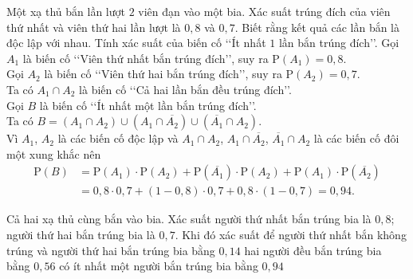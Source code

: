 \begin{bt}%

    Một xạ thủ bắn lần lượt $2$ viên đạn vào một bia. Xác suất trúng đích của viên thứ nhất và viên thứ hai lần lượt là $0{,}8$ và $0{,}7$. Biết rằng kết quả các lần bắn là độc lập với nhau. Tính xác suất của biến cố \lq\lq Ít nhất $1$ lần bắn trúng đích\rq\rq.
    \loigiai
    {
        Gọi $A_1$ là biến cố \lq\lq Viên thứ nhất bắn trúng đích\rq\rq, suy ra $\mathrm{P}\left(A_1\right)=0{,}8$.\\
        Gọi $A_2$ là biến cố \lq\lq Viên thứ hai bắn trúng đích\rq\rq, suy ra $\mathrm{P}\left(A_2\right)=0{,}7$.\\
        Ta có $A_1\cap A_2$ là biến cố \lq\lq Cả hai lần bắn đều trúng đích\rq\rq.\\
        Gọi $B$ là biến cố \lq\lq Ít nhất một lần bắn trúng đích\rq\rq.\\
        Ta có $B=\left(A_1\cap A_2\right)\cup\left(A_1\cap\overline{A_2}\right)\cup\left(\overline{A_1}\cap A_2\right)$.\\
        Vì $A_1$, $A_2$ là các biến cố độc lập và $A_1\cap A_2$, $ A_1\cap\overline{A_2}$, $\overline{A_1}\cap A_2$ là các biến cố đôi một xung khắc nên
        $$\begin{aligned}
            \mathrm{P}(B)
            &=\mathrm{P}\left(A_1\right)\cdot\mathrm{P}\left(A_2\right)+\mathrm{P}\left(\overline{A_1}\right)\cdot\mathrm{P}\left(A_2\right)+\mathrm{P}\left(A_1\right)\cdot\mathrm{P}\left(\overline{A_2}\right) \\
            &=0{,}8\cdot0{,}7+\left(1-0{,}8\right)\cdot0{,}7+0{,}8\cdot\left(1-0{,}7\right)=0{,}94.
        \end{aligned}$$
    }
\end{bt}

\begin{ex}%
	Cả hai xạ thủ cùng bắn vào bia. Xác suất người thứ nhất bắn trúng bia là $0{,}8$; người thứ hai bắn trúng bia là $0{,}7$. Khi đó xác suất để
	{\True người thứ nhất bắn không trúng và người thứ hai bắn trúng bia bằng $0{,}14$}
	{\True hai người đều bắn trúng bia bằng $0{,}56$}
	{\True có ít nhất một người bắn trúng bia bằng $0{,}94$}
\end{ex}

